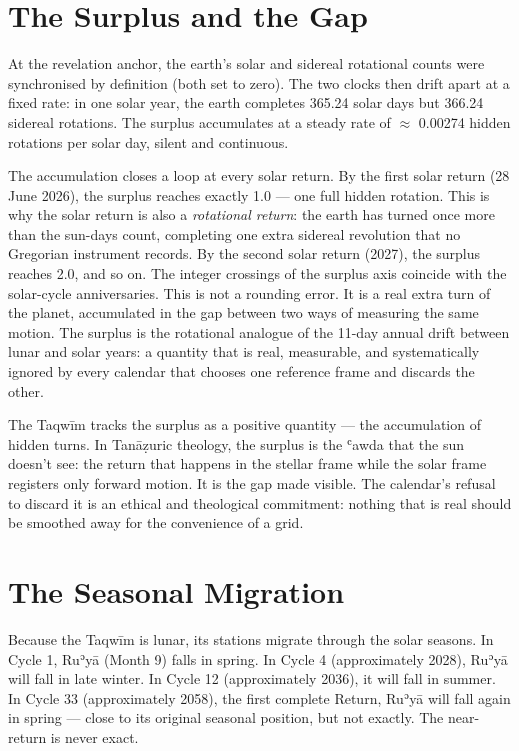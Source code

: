 \hypertarget{the-surplus-and-the-gap}{%
\section{The Surplus and the Gap}\label{the-surplus-and-the-gap}}

At the revelation anchor, the earth's solar and sidereal rotational counts were synchronised by definition (both set to zero). The two clocks then drift apart at a fixed rate: in one solar year, the earth completes 365.24 solar days but 366.24 sidereal rotations. The surplus accumulates at a steady rate of \(\approx\) 0.00274 hidden rotations per solar day, silent and continuous.

The accumulation closes a loop at every solar return. By the first solar return (28 June 2026), the surplus reaches exactly 1.0 --- one full hidden rotation. This is why the solar return is also a \emph{rotational return}: the earth has turned once more than the sun-days count, completing one extra sidereal revolution that no Gregorian instrument records. By the second solar return (2027), the surplus reaches 2.0, and so on. The integer crossings of the surplus axis coincide with the solar-cycle anniversaries. This is not a rounding error. It is a real extra turn of the planet, accumulated in the gap between two ways of measuring the same motion. The surplus is the rotational analogue of the 11-day annual drift between lunar and solar years: a quantity that is real, measurable, and systematically ignored by every calendar that chooses one reference frame and discards the other.

The Taqwīm tracks the surplus as a positive quantity --- the accumulation of hidden turns. In Tanāẓuric theology, the surplus is the ʿawda that the sun doesn't see: the return that happens in the stellar frame while the solar frame registers only forward motion. It is the gap made visible. The calendar's refusal to discard it is an ethical and theological commitment: nothing that is real should be smoothed away for the convenience of a grid.

\hypertarget{the-seasonal-migration}{%
\section{The Seasonal Migration}\label{the-seasonal-migration}}

Because the Taqwīm is lunar, its stations migrate through the solar seasons. In Cycle 1, Ruʾyā (Month 9) falls in spring. In Cycle 4 (approximately 2028), Ruʾyā will fall in late winter. In Cycle 12 (approximately 2036), it will fall in summer. In Cycle 33 (approximately 2058), the first complete Return, Ruʾyā will fall again in spring --- close to its original seasonal position, but not exactly. The near-return is never exact.

